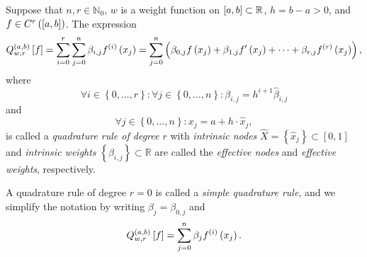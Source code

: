 \begin{frame}
	\begin{definition}
		Suppose that $n,r\in\mathbb{N}_{0}$,
		$w$ is a weight function on
		\begin{math}
			\left[a,b\right]\subset
			\mathbb{R}
		\end{math},
		$h=b-a>0$, and
		\begin{math}
			f\in
			C^{r}\left(
			\left[a,b\right]
			\right)
		\end{math}.
		The expression
		\begin{equation*}
			Q^{\left(a,b\right)}_{w,r}
			\left[f\right]=
			\sum_{i=0}^{r}
			\sum_{j=0}^{n}
			\beta_{i,j}
			f^{\left(i\right)}
			\left(x_{j}\right)=
			\sum_{j=0}^{n}
			\left(
			\beta_{0,j}
			f\left(x_{j}\right)+
			\beta_{1,j}
			f^{\prime}
			\left(x_{j}\right)+
			\cdots+
			\beta_{r,j}
			f^{\left(r\right)}
			\left(x_{j}\right)
			\right),
		\end{equation*}
		where
		\begin{equation*}
			\forall i\in
			\left\{0,\dotsc,r\right\}:
			\forall j\in
			\left\{0,\dotsc,n\right\}:
			\beta_{i,j}=
			h^{i+1}
			\widehat{\beta}_{i,j}
		\end{equation*}
		and
		\begin{equation*}
			\forall j\in
			\left\{0,\dotsc,n\right\}:
			x_{j}=
			a+
			h\cdot
			\widehat{x}_{j},
		\end{equation*}
		is called a \emph{quadrature rule of degree $r$} with
		\emph{intrinsic nodes}
		\begin{math}
			\widehat{X}=
			\left\{
			\widehat{x}_{j}
			\right\}\subset
			\left[0,1\right]
		\end{math}
		and \emph{intrinsic weights}
		\begin{math}
			\left\{
			\beta_{i,j}
			\right\}
			\subset
			\mathbb{R}
		\end{math}
		are called the \emph{effective nodes} and
		\emph{effective weights}, respectively.
	\end{definition}
	A quadrature rule of degree $r=0$ is called a
	\emph{simple quadrature rule}, and we simplify the notation
	by writing $\beta_{j}=\beta_{0,j}$ and
	\begin{equation*}
		Q^{\left(a,b\right)}_{w,r}
		\left[f\right]=
		\sum_{j=0}^{n}
		\beta_{j}
		f^{\left(i\right)}
		\left(x_{j}\right).
	\end{equation*}
\end{frame}

